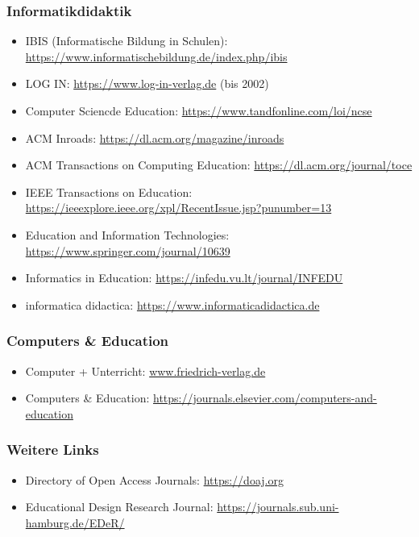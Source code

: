 \documentclass{../cssheet}
\begin{document}
\subsubsection*{Informatikdidaktik}
\begin{itemize}
\item IBIS (Informatische Bildung in Schulen): \url{https://www.informatischebildung.de/index.php/ibis}
\item LOG IN: \url{https://www.log-in-verlag.de} (bis 2002)
\item Computer Sciencde Education: \url{https://www.tandfonline.com/loi/ncse}
\item ACM Inroads: \url{https://dl.acm.org/magazine/inroads}
\item ACM Transactions on Computing Education: \url{https://dl.acm.org/journal/toce}
\item IEEE Transactions on Education: \url{https://ieeexplore.ieee.org/xpl/RecentIssue.jsp?punumber=13}
\item Education and Information Technologies: \url{https://www.springer.com/journal/10639}
\item Informatics in Education: \url{https://infedu.vu.lt/journal/INFEDU}
\item informatica didactica: \url{https://www.informaticadidactica.de}
\end{itemize}

\subsubsection*{Computers \& Education}
\begin{itemize}
\item Computer + Unterricht: \href{https://www.friedrich-verlag.de/shop/schule-und-unterricht/digitale-schule/fachzeitschriften/computer-unterricht}{www.friedrich-verlag.de}
\item Computers \& Education: \url{https://journals.elsevier.com/computers-and-education}
\end{itemize}

\subsubsection*{Weitere Links}
\begin{itemize}
\item Directory of Open Access Journals: \url{https://doaj.org}
\item Educational Design Research Journal: \url{https://journals.sub.uni-hamburg.de/EDeR/}
\end{itemize}
\end{document}
